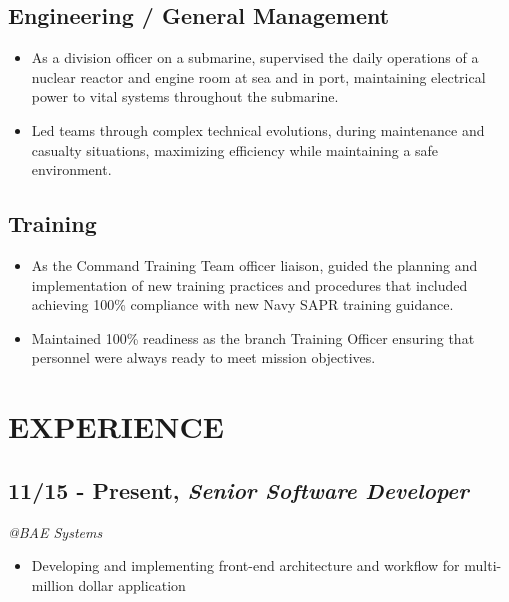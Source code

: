 \documentclass[10pt]{article}
\begin{document}
\subsection{Engineering / General
Management}\label{engineering-general-management}

\begin{itemize}
\itemsep1pt\parskip0pt
\item
  As a division officer on a submarine, supervised the daily operations
  of a nuclear reactor and engine room at sea and in port, maintaining
  electrical power to vital systems throughout the submarine.
\item
  Led teams through complex technical evolutions, during maintenance and
  casualty situations, maximizing efficiency while maintaining a safe
  environment.
\end{itemize}

\subsection{Training}\label{training}

\begin{itemize}
\itemsep1pt\parskip0pt
\item
  As the Command Training Team officer liaison, guided the planning and
  implementation of new training practices and procedures that included
  achieving 100\% compliance with new Navy SAPR training guidance.
\item
  Maintained 100\% readiness as the branch Training Officer ensuring
  that personnel were always ready to meet mission objectives.
\end{itemize}

\section{EXPERIENCE}\label{experience}

\subsection{\texorpdfstring{11/15 - Present, \textbf{\emph{Senior
Software
Developer}}}{11/15 - Present, Senior Software Developer}}\label{present-senior-software-developer}

\emph{@BAE Systems }

\begin{itemize}
\itemsep1pt\parskip0pt
\item
  Developing and implementing front-end architecture and workflow for
  multi-million dollar application
\end{itemize}
\end{document}
